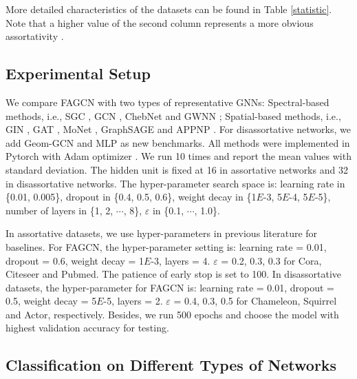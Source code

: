 \documentclass[letterpaper]{article} %
\begin{document}
More detailed characteristics of the datasets can be found in Table \ref{statistic}. Note that a higher value of the second column represents a more obvious assortativity \cite{mixing}.

\subsection{Experimental Setup}
\label{setup}

We compare FAGCN with two types of representative GNNs: Spectral-based methods, i.e., SGC \cite{SGC},  GCN \cite{GCN}, ChebNet \cite{ChebNet} and GWNN \cite{GWNN}; Spatial-based methods, i.e., GIN \cite{GIN}, GAT \cite{GAT}, MoNet \cite{MoNet}, GraphSAGE \cite{GraphSAGE} and APPNP \cite{PPNP}. For disassortative networks, we add Geom-GCN \cite{GeomGCN} and MLP as new benchmarks.
All methods were implemented in Pytorch with Adam optimizer \cite{Adam}.
We run 10 times and report the mean values with standard deviation. The hidden unit is fixed at 16 in assortative networks and 32 in disassortative networks.
The hyper-parameter search space is: learning rate in \{0.01, 0.005\}, dropout in \{0.4, 0.5, 0.6\}, weight decay in \{1$E$-3, 5$E$-4, 5$E$-5\}, number of layers in \{1, 2, $\cdots$, 8\}, $\varepsilon$ in \{0.1, $\cdots$, 1.0\}.

In assortative datasets, we use hyper-parameters in previous literature for baselines. For FAGCN, the hyper-parameter setting is: learning rate = 0.01, dropout = 0.6, weight decay = 1$E$-3, layers = 4. $\varepsilon$ = 0.2, 0.3, 0.3 for Cora, Citeseer and Pubmed. The patience of early stop is set to 100.
In disassortative datasets, the hyper-parameter for FAGCN is: learning rate = 0.01, dropout = 0.5, weight decay = 5$E$-5, layers = 2. $\varepsilon$ = 0.4, 0.3, 0.5 for Chameleon, Squirrel and Actor, respectively.
Besides, we run 500 epochs and choose the model with highest validation accuracy for testing.

\subsection{Classification on Different Types of Networks}
\label{sec:results}
\end{document}
